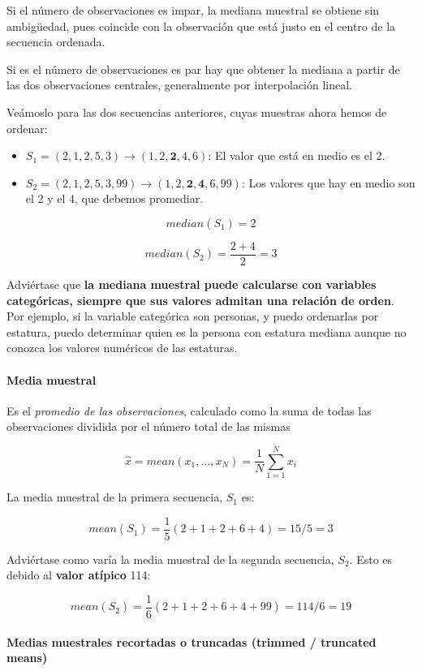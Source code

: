 \documentclass[11pt]{article}
\providecommand{\tightlist}{%
      \setlength{\itemsep}{0pt}\setlength{\parskip}{0pt}}
\begin{document}
Si el número de observaciones es impar, la mediana muestral se obtiene
sin ambigüedad, pues coincide con la observación que está justo en el
centro de la secuencia ordenada.

Si es el número de observaciones es par hay que obtener la mediana a
partir de las dos observaciones centrales, generalmente por
interpolación lineal.

    Veámoslo para las dos secuencias anteriores, cuyas muestras ahora hemos
de ordenar:

\begin{itemize}
\tightlist
\item
  \(S_1 = (2, 1, 2, 5, 3) \rightarrow (1, 2, \mathbf{2}, 4, 6)\): El
  valor que está en medio es el 2.
\item
  \(S_2 = (2, 1, 2, 5, 3, 99) \rightarrow (1, 2, \mathbf{2}, \mathbf{4}, 6, 99)\):
  Los valores que hay en medio son el 2 y el 4, que debemos promediar.
\end{itemize}

\[median(S_1) = 2\]

\[median(S_2) = \frac{2+4}{2} = 3\]

Adviértase que \textbf{la mediana muestral puede calcularse con
variables categóricas, siempre que sus valores admitan una relación de
orden}. Por ejemplo, si la variable categórica son personas, y puedo
ordenarlas por estatura, puedo determinar quien es la persona con
estatura mediana aunque no conozca los valores numéricos de las
estaturas.

    \paragraph{Media muestral}\label{media-muestral}

Es el \emph{promedio de las observaciones}, calculado como la suma de
todas las observaciones dividida por el número total de las mismas

\[\hat x = mean(x_1,\ldots, x_N) = \frac{1}{N}\sum_{1=1}^N x_i\]

    La media muestral de la primera secuencia, \(S_1\) es:

\[mean(S_1) = \frac{1}{5}(2+1+2+6+4)=15/5 = 3\]

Adviértase como varía la media muestral de la segunda secuencia,
\(S_2\). Esto es debido al \textbf{valor atípico} 114:

\[mean(S_2) = \frac{1}{6}(2+1+2+6+4+99)=114/6 = 19\]


    \paragraph{Medias muestrales recortadas o truncadas (trimmed / truncated
means)}\label{medias-muestrales-recortadas-o-truncadas-trimmed-truncated-means}
\end{document}
